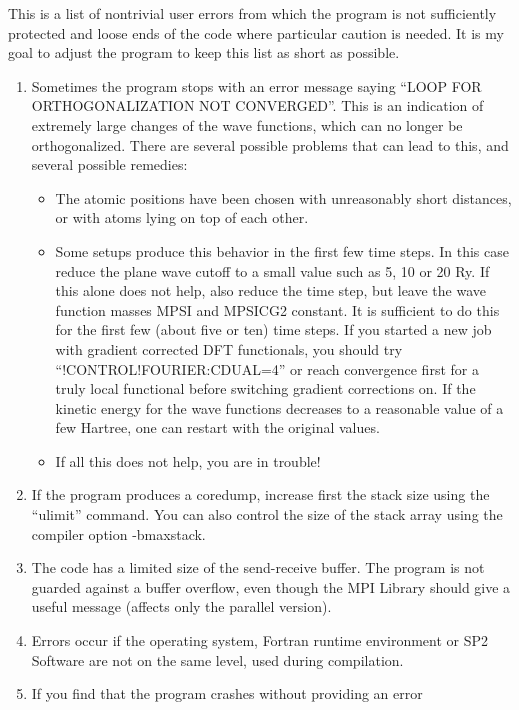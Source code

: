 \documentclass[final,12pt,makeidx,DIV=calc]{article}
\begin{document}
{{{{{{This is a list of nontrivial user errors from which the program is not
sufficiently protected and loose ends of the code where particular
caution is needed. It is my goal to adjust the program to
keep this list as short as possible.

\begin{enumerate}
\item Sometimes the program stops with an error message saying 
  ``LOOP FOR ORTHOGONALIZATION NOT CONVERGED''. This is an indication
  of extremely large changes of the wave functions, which can no
  longer be orthogonalized. There are several possible problems that can
  lead to this, and several possible remedies: 
  \begin{itemize}
  \item The atomic positions have been chosen with unreasonably short
    distances, or with atoms lying on top of each other.
  \item Some setups produce this behavior in the first few time steps.
    In this case reduce the plane wave cutoff to a small value such as
    5, 10 or 20 Ry. If this alone does not help, also reduce the time
    step, but leave the wave function masses MPSI and MPSICG2
    constant. It is sufficient to do this for the first few (about five
    or ten) time steps. If you started a new job with gradient
    corrected DFT functionals, you should try
    ``!CONTROL!FOURIER:CDUAL=4'' or reach convergence first for a
    truly local functional before switching gradient corrections
    on. If the kinetic energy for the wave functions decreases to a
    reasonable value of a few Hartree, one can restart with the
    original values.
  \item If all this does not help, you are in trouble!
  \end{itemize}
\item If the program produces a coredump, increase first the stack size
  using the ``ulimit'' command. You can also control the size of the stack
  array using the compiler option -bmaxstack.
\item The code has a limited size of the send-receive buffer. The
  program is not guarded against a buffer overflow, even though the MPI
  Library should give a useful message (affects only the parallel
  version).
\item Errors occur if the operating system, Fortran runtime
  environment or SP2 Software are not on the same level, 
  used during compilation.
\item If you find that the program crashes without providing an error

\end{enumerate}}}}}}}
\end{document}
